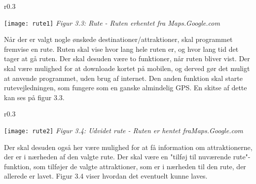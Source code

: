 \begin{wrapfigure}{r}{0.3\textwidth}
  \vspace{-30pt}
  \begin{center}
    \texttt{[image: rute1]} \newline
    \textit{Figur 3.3: Rute - Ruten er\newline hentet fra Maps.Google.com}\newline
  \end{center}
  \vspace{0pt}
  \vspace{-100pt}
\end{wrapfigure}


Når der er valgt nogle ønskede destinationer/attraktioner, skal programmet fremvise en rute. Ruten skal vise hvor lang hele ruten er, og hvor lang tid det tager at gå ruten. Der skal desuden være to funktioner, når ruten bliver vist. Der skal være mulighed for at downloade kortet på mobilen, og derved gør det muligt at anvende programmet, uden brug af internet. Den anden funktion skal starte rutevejledningen, som fungere som en ganske almindelig GPS. En skitse af dette kan ses på figur 3.3.
\newpage

\begin{wrapfigure}{r}{0.3\textwidth}
  \vspace{-20pt}
  \begin{center}
    \texttt{[image: rute2]} \newline
    \textit{Figur 3.4: Udvidet rute - Ruten er hentet fra\newline Maps.Google.com}\newline
  \end{center}
  \vspace{-20pt}
  \vspace{-10pt}
\end{wrapfigure}

Der skal desuden også her være mulighed for at få information om attraktionerne, der er i nærheden af den valgte rute. Der skal være en "tilføj til nuværende rute"-funktion, som tilføjer de valgte attraktioner, som er i nærheden til den rute, der allerede er lavet. Figur 3.4 viser hvordan det eventuelt kunne laves. \newline
\newline
\newline
\newline
\newline
\newline
\newline
\newline
\newline
 

